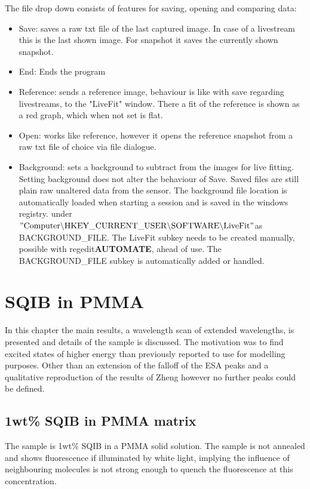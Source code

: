 \documentclass[twoside,openright]{scrreprt}
\begin{document}
The file drop down consists of features for saving, opening and comparing data:
\begin{itemize}
\item Save: saves a raw txt file of the last captured image. In case of a livestream this is the last shown image. For snapshot it saves the currently shown snapshot.
\item End: Ends the program
\item Reference: sends a reference image, behaviour is like with save regarding livestreams, to the "LiveFit" window. There a fit of the reference is shown as a red graph, which when not set is flat.
\item Open: works like reference, however it opens the reference snapshot from a raw txt file of choice via file dialogue.
\item Background: sets a background to subtract from the images for live fitting. Setting background does not alter the behaviour of Save. Saved files are still plain raw unaltered data from the sensor. The background file location is automatically loaded when starting a session and is saved in the windows registry. under $\mathrm{"Computer \backslash HKEY\_CURRENT\_USER \backslash SOFTWARE \backslash LiveFit"}$as BACKGROUND\_FILE. The LiveFit subkey needs to be created manually, possible with regedit\textbf{AUTOMATE}, ahead of use. The BACKGROUND\_FILE subkey is automatically added or handled.
\end{itemize}


\chapter{SQIB in PMMA}
In this chapter the main results, a wavelength scan of extended wavelengths, is presented and details of the sample is discussed. The motivation was to find excited states of higher energy than previously reported to use for modelling purposes. Other than an extension of the falloff of the ESA peaks and a qualitative reproduction of the results of Zheng\cite{Zheng2020} however no further peaks could be defined.

\section{1wt\% SQIB in PMMA matrix}
The sample is 1wt\% SQIB in a PMMA solid solution. The sample is not annealed and shows fluorescence if illuminated by white light, implying the influence of neighbouring molecules is not strong enough to quench the fluorescence at this concentration. \\
\end{document}
